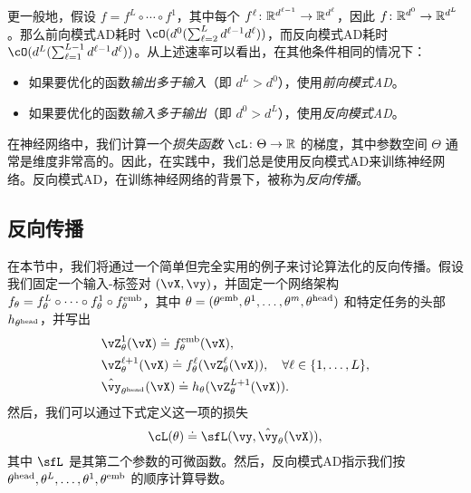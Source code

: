 \documentclass[../../book-main.tex]{subfiles}
\begin{document}
更一般地，假设 \(f = f^{L} \circ \cdots \circ f^{1}\)，其中每个 \(f^{\ell} \colon \mathbb{R}^{d^{\ell - 1}} \to \mathbb{R}^{d^{\ell}}\)，因此 \(f \colon \mathbb{R}^{d^{0}} \to \mathbb{R}^{d^{L}}\)。那么前向模式AD耗时 \(\cO(d^{0}(\sum_{\ell = 2}^{L}d^{\ell - 1}d^{\ell}))\)，而反向模式AD耗时 \(\cO(d^{L}(\sum_{\ell = 1}^{L - 1}d^{\ell - 1}d^{\ell}))\)。从上述速率可以看出，在其他条件相同的情况下：
\begin{itemize}
    \item 如果要优化的函数\textit{输出多于输入}（即 \(d^{L} > d^{0}\)），使用\textit{前向模式AD}。
    \item 如果要优化的函数\textit{输入多于输出}（即 \(d^{0} > d^{L}\)），使用\textit{反向模式AD}。
\end{itemize}
在神经网络中，我们计算一个\textit{损失函数} \(\cL \colon \Theta \to \R\) 的梯度，其中参数空间 \(\Theta\) 通常是维度非常高的。因此，在实践中，我们总是使用反向模式AD来训练神经网络。反向模式AD，在训练神经网络的背景下，被称为\textit{反向传播}。

\subsection{反向传播}
\label{app:BP-section}
在本节中，我们将通过一个简单但完全实用的例子来讨论算法化的反向传播。假设我们固定一个输入-标签对 \((\vX, \vy)\)，并固定一个网络架构 \(f_{\theta} = f_{\theta}^{L} \circ \cdots \circ f_{\theta}^{1} \circ f_{\theta}^{\mathrm{emb}}\)，其中 \(\theta = (\theta^{\mathrm{emb}}, \theta^{1}, \dots, \theta^{m}, \theta^{\mathrm{head}})\) 和特定任务的头部 \(h_{\theta^{\mathrm{head}}}\)，并写出
\begin{align}
    &\vZ_{\theta}^{1}(\vX) \doteq f_{\theta}^{\emb}(\vX), \\ 
    &\vZ_{\theta}^{\ell + 1}(\vX) \doteq f_{\theta}^{\ell}(\vZ_{\theta}^{\ell}(\vX)), \quad \forall \ell \in \{1, \dots, L\}, \\
    &\hat{\vy}_{\theta^{\head}}(\vX) \doteq h_{\theta}(\vZ_{\theta}^{L+1}(\vX)).
\end{align}
然后，我们可以通过下式定义这一项的损失
\begin{equation}
    \cL(\theta) \doteq \sfL(\vy, \hat{\vy}_{\theta}(\vX)),
\end{equation}
其中 \(\sfL\) 是其第二个参数的可微函数。然后，反向模式AD指示我们按 \(\theta^{\mathrm{head}}, \theta^{L}, \dots, \theta^{1}, \theta^{\mathrm{emb}}\) 的顺序计算导数。
\end{document}
